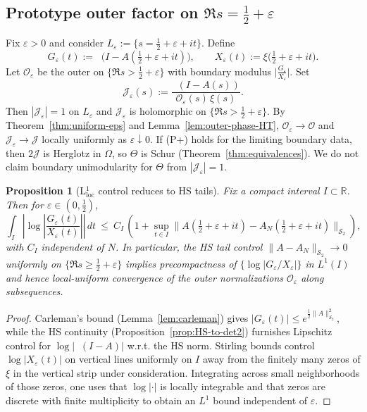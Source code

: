 \documentclass[11pt]{article}
\newtheorem{proposition}[theorem]{Proposition}
\theoremstyle{definition}
\theoremstyle{remark}
\newcommand{\HS}{\mathcal{S}_2}
\DeclareMathOperator{\dettwo}{det_2}
\begin{document}
\subsection{Prototype outer factor on \(\Re s=\tfrac12+\varepsilon\)}\label{subsec:outer-prototype}
Fix \(\varepsilon>0\) and consider \(L_{\varepsilon}:=\{s=\tfrac12+\varepsilon+it\}\). Define
\[
 G_{\varepsilon}(t):=\dettwo\big(I-A(\tfrac12+\varepsilon+it)\big),\qquad X_{\varepsilon}(t):=\xi\big(\tfrac12+\varepsilon+it\big).
\]
Let \(\mathcal O_{\varepsilon}\) be the outer on \(\{\Re s>\tfrac12+\varepsilon\}\) with boundary modulus \(\big|\frac{G_{\varepsilon}}{X_{\varepsilon}}\big|\). Set
\[
 \mathcal J_{\varepsilon}(s):=\frac{\dettwo(I-A(s))}{\mathcal O_{\varepsilon}(s)\,\xi(s)}.
\]
Then \(|\mathcal J_{\varepsilon}|=1\) on \(L_{\varepsilon}\) and \(\mathcal J_{\varepsilon}\) is holomorphic on \(\{\Re s>\tfrac12+\varepsilon\}\). By Theorem~\ref{thm:uniform-eps} and Lemma~\ref{lem:outer-phase-HT}, \(\mathcal O_{\varepsilon}\to\mathcal O\) and \(\mathcal J_{\varepsilon}\to\mathcal J\) locally uniformly as \(\varepsilon\downarrow 0\). If (P+) holds for the limiting boundary data, then \(2\mathcal J\) is Herglotz in \(\Omega\), so \(\Theta\) is Schur (Theorem~\ref{thm:equivalences}). We do not claim boundary unimodularity for \(\Theta\) from \(|\mathcal J_{\varepsilon}|=1\).

\begin{proposition}[L$^1_{\mathrm{loc}}$ control reduces to HS tails]\label{prop:L1loc}
Fix a compact interval $I\subset\mathbb R$. Then for \(\varepsilon\in(0,\tfrac12)\),
\[
 \int_{I}\left|\log\left|\frac{G_{\varepsilon}(t)}{X_{\varepsilon}(t)}\right|\right|\,dt\ \le\ C_I\,\left(1+\sup_{t\in I}\|A(\tfrac12+\varepsilon+it)-A_N(\tfrac12+\varepsilon+it)\|_{\HS}\right),
\]
with $C_I$ independent of $N$. In particular, the HS tail control $\|A-A_N\|_{\HS}\to 0$ uniformly on \(\{\Re s\ge \tfrac12+\varepsilon\}\) implies precompactness of \(\{\log|G_{\varepsilon}/X_{\varepsilon}|\}\) in $L^1(I)$ and hence local-uniform convergence of the outer normalizations \(\mathcal O_{\varepsilon}\) along subsequences.
\end{proposition}
\begin{proof}
Carleman's bound (Lemma~\ref{lem:carleman}) gives \(|G_{\varepsilon}(t)|\le e^{\tfrac12\|A\|_{\HS}^2}\), while the HS continuity (Proposition~\ref{prop:HS-to-det2}) furnishes Lipschitz control for \(\log|\dettwo(I-A)|\) w.r.t. the HS norm. Stirling bounds control \(\log|X_{\varepsilon}(t)|\) on vertical lines uniformly on $I$ away from the finitely many zeros of \(\xi\) in the vertical strip under consideration. Integrating across small neighborhoods of those zeros, one uses that \(\log|\cdot|\) is locally integrable and that zeros are discrete with finite multiplicity to obtain an $L^1$ bound independent of \(\varepsilon\).
\end{proof}
\end{document}

